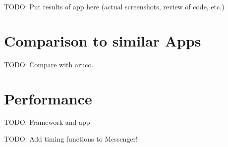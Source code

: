 TODO: Put results of app here (actual screenshots, review of code, etc.)

\section{Comparison to similar Apps}

TODO: Compare with aruco.

\section{Performance}

TODO: Framework and app

TODO: Add timing functions to Messenger!
